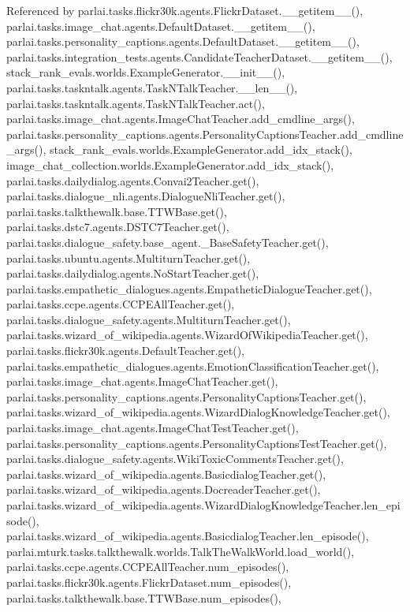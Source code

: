Referenced by parlai.\+tasks.\+flickr30k.\+agents.\+Flickr\+Dataset.\+\_\+\+\_\+getitem\+\_\+\+\_\+(), parlai.\+tasks.\+image\+\_\+chat.\+agents.\+Default\+Dataset.\+\_\+\+\_\+getitem\+\_\+\+\_\+(), parlai.\+tasks.\+personality\+\_\+captions.\+agents.\+Default\+Dataset.\+\_\+\+\_\+getitem\+\_\+\+\_\+(), parlai.\+tasks.\+integration\+\_\+tests.\+agents.\+Candidate\+Teacher\+Dataset.\+\_\+\+\_\+getitem\+\_\+\+\_\+(), stack\+\_\+rank\+\_\+evals.\+worlds.\+Example\+Generator.\+\_\+\+\_\+init\+\_\+\+\_\+(), parlai.\+tasks.\+taskntalk.\+agents.\+Task\+N\+Talk\+Teacher.\+\_\+\+\_\+len\+\_\+\+\_\+(), parlai.\+tasks.\+taskntalk.\+agents.\+Task\+N\+Talk\+Teacher.\+act(), parlai.\+tasks.\+image\+\_\+chat.\+agents.\+Image\+Chat\+Teacher.\+add\+\_\+cmdline\+\_\+args(), parlai.\+tasks.\+personality\+\_\+captions.\+agents.\+Personality\+Captions\+Teacher.\+add\+\_\+cmdline\+\_\+args(), stack\+\_\+rank\+\_\+evals.\+worlds.\+Example\+Generator.\+add\+\_\+idx\+\_\+stack(), image\+\_\+chat\+\_\+collection.\+worlds.\+Example\+Generator.\+add\+\_\+idx\+\_\+stack(), parlai.\+tasks.\+dailydialog.\+agents.\+Convai2\+Teacher.\+get(), parlai.\+tasks.\+dialogue\+\_\+nli.\+agents.\+Dialogue\+Nli\+Teacher.\+get(), parlai.\+tasks.\+talkthewalk.\+base.\+T\+T\+W\+Base.\+get(), parlai.\+tasks.\+dstc7.\+agents.\+D\+S\+T\+C7\+Teacher.\+get(), parlai.\+tasks.\+dialogue\+\_\+safety.\+base\+\_\+agent.\+\_\+\+Base\+Safety\+Teacher.\+get(), parlai.\+tasks.\+ubuntu.\+agents.\+Multiturn\+Teacher.\+get(), parlai.\+tasks.\+dailydialog.\+agents.\+No\+Start\+Teacher.\+get(), parlai.\+tasks.\+empathetic\+\_\+dialogues.\+agents.\+Empathetic\+Dialogue\+Teacher.\+get(), parlai.\+tasks.\+ccpe.\+agents.\+C\+C\+P\+E\+All\+Teacher.\+get(), parlai.\+tasks.\+dialogue\+\_\+safety.\+agents.\+Multiturn\+Teacher.\+get(), parlai.\+tasks.\+wizard\+\_\+of\+\_\+wikipedia.\+agents.\+Wizard\+Of\+Wikipedia\+Teacher.\+get(), parlai.\+tasks.\+flickr30k.\+agents.\+Default\+Teacher.\+get(), parlai.\+tasks.\+empathetic\+\_\+dialogues.\+agents.\+Emotion\+Classification\+Teacher.\+get(), parlai.\+tasks.\+image\+\_\+chat.\+agents.\+Image\+Chat\+Teacher.\+get(), parlai.\+tasks.\+personality\+\_\+captions.\+agents.\+Personality\+Captions\+Teacher.\+get(), parlai.\+tasks.\+wizard\+\_\+of\+\_\+wikipedia.\+agents.\+Wizard\+Dialog\+Knowledge\+Teacher.\+get(), parlai.\+tasks.\+image\+\_\+chat.\+agents.\+Image\+Chat\+Test\+Teacher.\+get(), parlai.\+tasks.\+personality\+\_\+captions.\+agents.\+Personality\+Captions\+Test\+Teacher.\+get(), parlai.\+tasks.\+dialogue\+\_\+safety.\+agents.\+Wiki\+Toxic\+Comments\+Teacher.\+get(), parlai.\+tasks.\+wizard\+\_\+of\+\_\+wikipedia.\+agents.\+Basicdialog\+Teacher.\+get(), parlai.\+tasks.\+wizard\+\_\+of\+\_\+wikipedia.\+agents.\+Docreader\+Teacher.\+get(), parlai.\+tasks.\+wizard\+\_\+of\+\_\+wikipedia.\+agents.\+Wizard\+Dialog\+Knowledge\+Teacher.\+len\+\_\+episode(), parlai.\+tasks.\+wizard\+\_\+of\+\_\+wikipedia.\+agents.\+Basicdialog\+Teacher.\+len\+\_\+episode(), parlai.\+mturk.\+tasks.\+talkthewalk.\+worlds.\+Talk\+The\+Walk\+World.\+load\+\_\+world(), parlai.\+tasks.\+ccpe.\+agents.\+C\+C\+P\+E\+All\+Teacher.\+num\+\_\+episodes(), parlai.\+tasks.\+flickr30k.\+agents.\+Flickr\+Dataset.\+num\+\_\+episodes(), parlai.\+tasks.\+talkthewalk.\+base.\+T\+T\+W\+Base.\+num\+\_\+episodes(), 